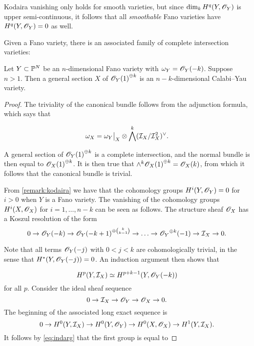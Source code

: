 \begin{remark}
\label{remark:kodaira}
Kodaira vanishing only holds for smooth varieties, but since $\dim_k H^q(Y,\OO_Y)$ is upper semi-continuous, it follows that all \emph{smoothable} Fano varieties have $H^q(Y,\OO_Y)=0$ as well.
\end{remark}


Given a Fano variety, there is an associated family of complete intersection \CY varieties:

\begin{proposition}
\label{prop:anticanonicalsection}
Let $Y \subset \P^N$ be an $n$-dimensional Fano variety with ${\omega_Y=\OO_Y(-k)}$. Suppose $n > 1$. Then a general section $X$ of ${\OO_Y(1)}^{\oplus k}$ is an $n-k$-dimensional Calabi--Yau variety.
\end{proposition}
\begin{proof}
The triviality of the canonical bundle follows from the adjunction formula, which says that

$$
\omega_X = \restr{\omega_Y}{X} \otimes \bigwedge^k (\mathcal I_X /\mathcal I_X^2)^\vee.
$$

A general section of ${\OO_Y(1)}^{\oplus k}$ is a complete intersection, and the normal bundle is then equal to ${\OO_X(1)}^{\oplus k}$. It is then true that $\wedge^k {\OO_X(1)}^{\oplus k} = \OO_X(k)$, from which it follows that the canonical bundle is trivial.

From \cref{remark:kodaira} we have that the cohomology groups $H^i(Y,\OO_Y)=0$ for $ i> 0$ when $Y$ is a Fano variety. The vanishing of the cohomology groups $H^i(X,\OO_X)$ for $i=1,\ldots,n-k$ can be seen as follows. The structure sheaf $\OO_X$ has a Koszul resolution of the form
\[
0 \to \OO_Y(-k) \to {\OO_Y(-k+1)}^{\oplus \binom {k}{k-1}} \to \ldots \to {\OO_Y}^{\oplus k}(-1) \to \mathcal I_X \to 0.
\]

Note that all terms $\OO_Y(-j)$ with $0 < j < k$ are cohomologically trivial, in the sense that $H^\ast(Y,\OO_Y(-j))=0$. An induction argument then shows that

\begin{equation}
\label{eq:indarg}
H^p(Y,\mathcal I_X) \simeq H^{p+k-1}(Y,\OO_Y(-k))
\end{equation}
for all $p$. Consider the ideal sheaf sequence
\[
0 \to \mathcal I_X \to \OO_Y \to \OO_X  \to 0.
\]
The beginning of the associated long exact sequence is 
\[
0 \to H^0(Y,\mathcal I_X) \to H^0(Y,\OO_Y) \to H^0(X,\OO_X) \to H^1(Y,\mathcal I_X).
\]
It follows by \eqref{eq:indarg} that the first group is equal to


\end{proof}
